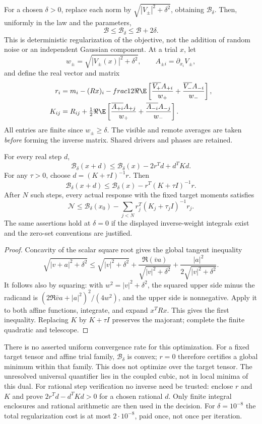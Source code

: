 For a chosen $\delta>0$, replace each norm by
$\sqrt{|V_\pm|^2+\delta^2}$, obtaining $\mathcal B_\delta$.
Then, uniformly in the law and the parameters,
\[
 \mathcal B\le\mathcal B_\delta\le\mathcal B+2\delta.
\]
This is deterministic regularization of the objective, not the addition
of random noise or an independent Gaussian component.
At a trial $x$, let
\[
 w_\pm=\sqrt{|V_\pm(x)|^2+\delta^2},\qquad
 A_{\pm i}=\partial_{x_i}V_\pm,
\]
and define the real vector and matrix
\begin{align*}
 r_i&=m_i-(Rx)_i-	frac12\Re\E\left[
       \frac{\overline{V_+}A_{+i}}{w_+}
       +\frac{\overline{V_-}A_{-i}}{w_-}\right],\\
 K_{ij}&=R_{ij}+\tfrac12\Re\E\left[
       \frac{\overline{A_{+i}}A_{+j}}{w_+}
       +\frac{\overline{A_{-i}}A_{-j}}{w_-}\right].
\end{align*}
All entries are finite since $w_\pm\ge\delta$.
The visible and remote averages are taken \emph{before} forming the
inverse matrix. Shared drivers and phases are retained.
\begin{theorem}
\label{thm:joint-dual-descent}
For every real step $d$,
\[
 \mathcal B_\delta(x+d)\le
 \mathcal B_\delta(x)-2r^Td+d^TKd.
\]
For any $\tau>0$, choose $d=(K+\tau I)^{-1}r$. Then
\[
 \boxed{\quad
 \mathcal B_\delta(x+d)\le\mathcal B_\delta(x)
                   -r^T(K+\tau I)^{-1}r.
 \quad}
\]
After $N$ such steps, every actual response with the fixed target
moments satisfies
\[
 \mathcal N\le\mathcal B_\delta(x_0)
       -\sum_{j<N}r_j^T(K_j+\tau_j I)^{-1}r_j.
\]
The same assertions hold at $\delta=0$ if the displayed inverse-weight
integrals exist and the zero-set conventions are justified.
\end{theorem}
\begin{proof}
Concavity of the scalar square root gives the global tangent inequality
\[
 \sqrt{|v+a|^2+\delta^2}
 \le\sqrt{|v|^2+\delta^2}
 +\frac{\Re(\bar va)}{\sqrt{|v|^2+\delta^2}}
 +\frac{|a|^2}{2\sqrt{|v|^2+\delta^2}}.
\]
It follows also by squaring: with $w^2=|v|^2+\delta^2$,
the squared upper side minus the radicand is
$(2\Re\bar va+|a|^2)^2/(4w^2)$, and the upper side is nonnegative.
Apply it to both affine functions, integrate, and expand $x^TRx$.
This gives the first inequality. Replacing $K$ by $K+\tau I$ preserves
the majorant; complete the finite quadratic and telescope.
\end{proof}
There is no asserted uniform convergence rate for this optimization.
For a fixed target tensor and affine trial family, $\mathcal B_\delta$
is convex; $r=0$ therefore certifies a global minimum within that family.
This does not optimize over the target tensor. The unresolved universal
quantifier lies in the coupled cubic, not in local minima of this dual.
For rational step verification no inverse need be trusted: enclose $r$
and $K$ and prove $2r^Td-d^TKd>0$ for a chosen rational $d$.
Only finite integral enclosures and rational arithmetic are then used in
the decision. For $\delta=10^{-8}$ the total regularization cost is at
most $2\cdot10^{-8}$, paid once, not once per iteration.

